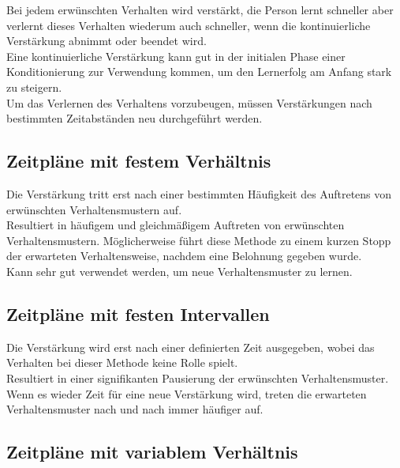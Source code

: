 		Bei jedem erwünschten Verhalten wird verstärkt, die Person lernt schneller aber verlernt dieses Verhalten wiederum auch schneller, wenn die kontinuierliche Verstärkung abnimmt oder beendet wird. \\
Eine kontinuierliche Verstärkung kann gut in der initialen Phase einer Konditionierung zur Verwendung kommen, um den Lernerfolg am Anfang stark zu steigern.\\
Um das Verlernen des Verhaltens vorzubeugen, müssen Verstärkungen nach bestimmten Zeitabständen neu durchgeführt werden. \\

		\subsection{Zeitpläne mit festem Verhältnis}
		
		Die Verstärkung tritt erst nach einer bestimmten Häufigkeit des Auftretens von erwünschten Verhaltensmustern auf.\\
Resultiert in häufigem und gleichmäßigem Auftreten von erwünschten Verhaltensmustern. Möglicherweise führt diese Methode zu einem kurzen Stopp der erwarteten Verhaltensweise, nachdem eine Belohnung gegeben wurde. \\
Kann sehr gut verwendet werden, um neue Verhaltensmuster zu lernen.\\

		\subsection{Zeitpläne mit festen Intervallen}
		
		Die Verstärkung wird erst nach einer definierten Zeit ausgegeben, wobei das Verhalten bei dieser Methode keine Rolle spielt. \\
Resultiert in einer signifikanten Pausierung der erwünschten Verhaltensmuster. Wenn es wieder Zeit für eine neue Verstärkung wird, treten die erwarteten Verhaltensmuster nach und nach immer häufiger auf. \\

		\subsection{Zeitpläne mit variablem Verhältnis}
		

